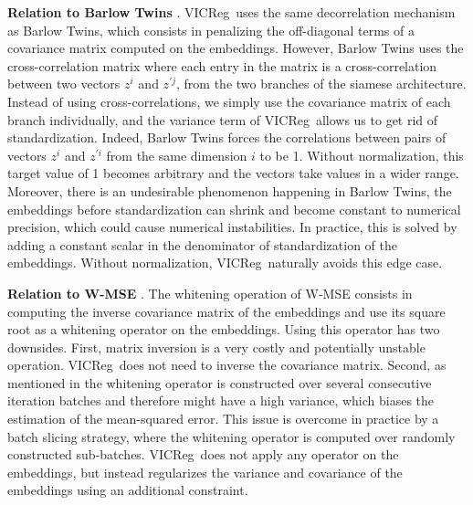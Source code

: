 \documentclass{article}
\newcommand{\algo}{VICReg}
\begin{document}
\vspace{2mm}
\textbf{Relation to Barlow Twins} \cite{zbontar2021barlow}. \algo \ uses the same decorrelation mechanism as Barlow Twins, which consists in penalizing the off-diagonal terms of a covariance matrix computed on the embeddings. However, Barlow Twins uses the cross-correlation matrix where each entry in the matrix is a cross-correlation between two vectors $z^{i}$ and $z^{\prime j}$, from the two branches of the siamese architecture. Instead of using cross-correlations, we simply use the covariance matrix of each branch individually, and the variance term of \algo \ allows us to get rid of standardization. Indeed, Barlow Twins forces the correlations between pairs of vectors $z^{i}$ and $z^{\prime i}$ from the same dimension $i$ to be 1. Without normalization, this target value of 1 becomes arbitrary and the vectors take values in a wider range. Moreover, there is an undesirable phenomenon happening in Barlow Twins, the embeddings before standardization can shrink and become constant to numerical precision, which could cause numerical instabilities. In practice, this is solved by adding a constant scalar in the denominator of standardization of the embeddings. Without normalization, \algo \ naturally avoids this edge case.

\vspace{2mm}
\textbf{Relation to W-MSE} \cite{ermolov2021whitening}. The whitening operation of W-MSE consists in computing the inverse covariance matrix of the embeddings and use its square root as a whitening operator on the embeddings. Using this operator has two downsides. First, matrix inversion is a very costly and potentially unstable operation. \algo \ does not need to inverse the covariance matrix. Second, as mentioned in \cite{ermolov2021whitening} the whitening operator is constructed over several consecutive iteration batches and therefore might have a high variance, which biases the estimation of the mean-squared error. This issue is overcome in practice by a batch slicing strategy, where the whitening operator is computed over randomly constructed sub-batches. \algo \ does not apply any operator on the embeddings, but instead regularizes the variance and covariance of the embeddings using an additional constraint.
\end{document}
